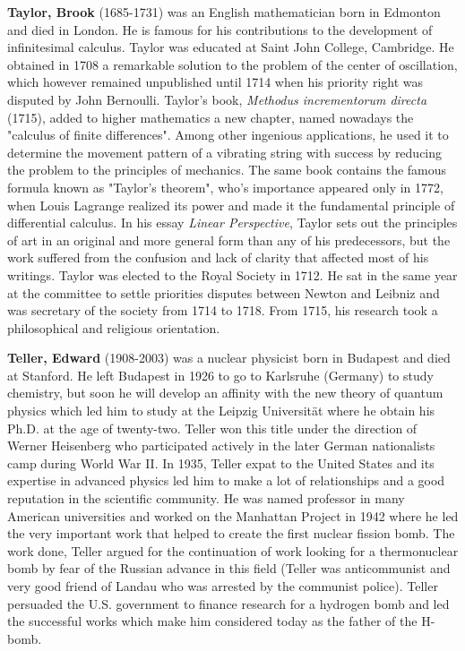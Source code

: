 {}

\textbf{Taylor, Brook} (1685-1731) was an English mathematician born in Edmonton and died in London. He is famous for his contributions to the development of infinitesimal calculus. Taylor was educated at Saint John College, Cambridge. He obtained in 1708 a remarkable solution to the problem of the center of oscillation, which however remained unpublished until 1714 when his priority right was disputed by John Bernoulli. Taylor's book, \textit{Methodus incrementorum directa }(1715), added to higher mathematics a new chapter, named nowadays the "calculus of finite differences". Among other ingenious applications, he used it to determine the movement pattern of a vibrating string with success by reducing the problem to the principles of mechanics. The same book contains the famous formula known as "Taylor's theorem", who's importance appeared only in 1772, when Louis Lagrange realized its power and made it the fundamental principle of differential calculus. In his essay \textit{Linear Perspective}, Taylor sets out the principles of art in an original and more general form than any of his predecessors, but the work suffered from the confusion and lack of clarity that affected most of his writings. Taylor was elected to the Royal Society in 1712. He sat in the same year at the committee to settle priorities disputes between Newton and Leibniz and was secretary of the society from 1714 to 1718. From 1715, his research took a philosophical and religious orientation.

\textbf{Teller, Edward} (1908-2003) was a nuclear physicist born in Budapest and died at Stanford. He left Budapest in 1926 to go to Karlsruhe (Germany) to study chemistry, but soon he will develop an affinity with the new theory of quantum physics which led him to study at the Leipzig Universität where he obtain his Ph.D. at the age of twenty-two. Teller won this title under the direction of Werner Heisenberg who participated actively in the later German nationalists camp during World War II. In 1935, Teller expat to the United States and its expertise in advanced physics led him to make a lot of relationships and a good reputation in the scientific community. He was named professor in many American universities and worked on the Manhattan Project in 1942 where he led the very important work that helped to create the first nuclear fission bomb. The work done, Teller argued for the continuation of work looking for a thermonuclear bomb by fear of the Russian advance in this field (Teller was anticommunist and very good friend of Landau who was arrested by the communist police). Teller persuaded the U.S. government to finance research for a hydrogen bomb and led the successful works which make him considered today as the father of the H-bomb.

